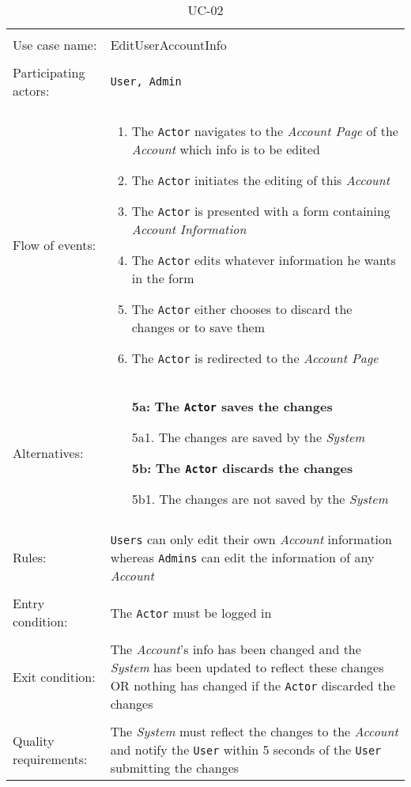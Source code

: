 
\label{sec:Use Cases}

\noindent
\begin{table}[h!]
\caption{UC-02}
\label{UC-02}
\centering
\begin{tabular}{ l  p{8cm} } 
\hline 
\\
Use case name:  & EditUserAccountInfo   \\   \hline    
\\            
Participating actors:  & \texttt{User, \texttt{Admin}} \\   \hline   
\\      
Flow of events: & \begin{enumerate}
\item{The \texttt{Actor} navigates to the \textit{Account Page} of the \textit{Account} which info is to be edited}
\item{The \texttt{Actor} initiates the editing of this \textit{Account}}
\item{The \texttt{Actor} is presented with a form containing \textit{Account Information}}
\item{The \texttt{Actor} edits whatever information he wants in the form}
\item{The \texttt{Actor} either chooses to discard the changes or to save them}
\item{The \texttt{Actor} is redirected to the \textit{Account Page}}
\end{enumerate}
\\
Alternatives: & \begin{itemize}
\item[\textbf{5a:}]{\textbf{The \texttt{Actor} saves the changes}}
\item[]  5a1. The changes are saved by the \textit{System}
\item[\textbf{5b:}]\textbf{The \texttt{Actor} discards the changes}
\item[]  5b1. The changes are not saved by the \textit{System}
\end{itemize}
\\ \hline
\\
Rules: & \texttt{Users} can only edit their own \textit{Account} information whereas \texttt{Admins} can edit the information of any  \textit{Account}
\\   \hline 
\\
Entry condition: & The \texttt{Actor} must be logged in \\ \hline
\\
Exit condition: & The \textit{Account}'s info has been changed and the \textit{System} has been updated to reflect these changes OR
nothing has changed if the \texttt{Actor} discarded the changes\\ \hline
\\
Quality requirements: & The \textit{System} must reflect the changes to the \textit{Account} and notify the \texttt{User} within 5 seconds of the \texttt{User} submitting the changes \\ \hline  
\end{tabular}
\end{table}

